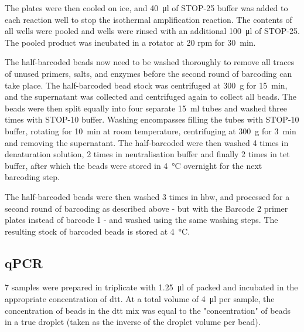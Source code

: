 \begin{appendix}
\begin{multicols}{2}
The plates were then cooled on ice, and \SI{40}{\ul} of STOP-25 buffer was added to each reaction well to stop the isothermal amplification reaction. The contents of all wells were pooled and wells were rinsed with an additional \SI{100}{\ul} of STOP-25. The pooled product was incubated in a rotator at 20 rpm for \SI{30}{\minute}.\pms

The half-barcoded beads now need to be washed thoroughly to remove all traces of unused primers, salts,  and enzymes before the second round of barcoding can take place. The half-barcoded bead stock was centrifuged at \SI{300}{\g} for \SI{15}{\minute}, and the supernatant was collected and centrifuged again to collect all beads. The beads were then split equally into four separate \SI{15}{\ml} tubes and washed three times with STOP-10 buffer. Washing encompasses filling the tubes with STOP-10 buffer, rotating for \SI{10}{\minute} at room temperature, centrifuging at \SI{300}{\g} for \SI{3}{\minute} and removing the supernatant. The half-barcoded  were then washed 4 times in denaturation solution, 2 times in neutralisation buffer and finally 2 times in \acrshort{tet} buffer, after which the beads were stored in \SI{4}{\celsius} overnight for the next barcoding step.\pms

The half-barcoded beads were then washed 3 times in \acrshort{hbw}, and processed for a second round of barcoding as described above - but with the Barcode 2 primer plates instead of barcode 1 - and washed using the same washing steps. The resulting stock of barcoded beads is stored at \SI{4}{\celsius}.

\subsection{qPCR}
\label{app:meth_qpcr}
7 samples were prepared in triplicate with \SI{1.25}{\ul} of packed  and incubated in the appropriate concentration of \acrshort{dtt}. At a total volume of \SI{4}{\ul} per sample, the concentration of beads in the \acrshort{dtt} mix was equal to the "concentration" of beads in a true droplet (taken as the inverse of the droplet volume per bead).\pms


\end{multicols}
\end{appendix}
